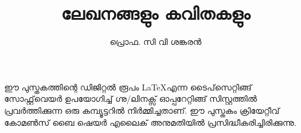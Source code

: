 \documentclass[12pt,a4paper]{book}
\title{\fontsize{40pt}{1em}\selectfont \color{white}ലേഖനങ്ങളും കവിതകളും}
\author{\fontsize{20pt}{1em}\selectfont \color{white} പ്രൊഫ. സി വി ശങ്കരൻ}
\date{}
\newcommand*\cleartoleftpage{%
  \clearpage
  \ifodd\value{page}\hbox{}\newpage\fi
}
\begin{document}
\pagecolor{Maroon}
\maketitle
{}
\pagecolor{white}
\newpage
\vspace*{\fill}
\noindent
\parbox{10cm}{
ഈ പുസ്തകത്തിന്റെ ഡിജിറ്റൽ രൂപം \LaTeX എന്ന ടൈപ്‌സെറ്റിങ്ങ് സോഫ്റ്റ്‌വെയർ ഉപയോഗിച്ച് ഗ്നു/ലിനക്സ് ഓപ്പറേറ്റിങ്ങ് സിസ്റ്റത്തിൽ പ്രവർത്തിക്കുന്ന ഒരു കമ്പ്യൂട്ടറിൽ നിർമ്മിച്ചതാണ്. ഈ പുസ്തകം ക്രിയേറ്റീവ് കോമൺസ് ബൈ ഷെയർ എലൈക് അനുമതിയിൽ പ്രസിദ്ധീകരിച്ചിരിക്കുന്നു.}
\newpage
\cleartoleftpage
\tableofcontents
\newpage\null\thispagestyle{empty} %
\setcounter{page}{1} %
\cleartoleftpage
\lfoot{}
\rfoot{}
\cfoot{\thepage} %
\lhead{}
\chead{}
\pagestyle{fancy}
\renewcommand{\headrulewidth}{0pt}



























\newpage
\pagecolor{Maroon}
\newpage\null\thispagestyle{empty}\newpage %
\end{document}
